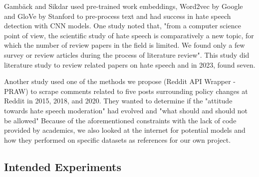 \documentclass[conference]{IEEEtran}
\begin{document}
Gambäck and Sikdar\cite{b16} used pre-trained work embeddings, Word2vec by Google and GloVe by Stanford to pre-process text and had success in hate speech detection with CNN models. One study noted that, "from a computer science point of view, the scientific study of hate speech is comparatively a new topic, for which the number of review papers in the field is limited. We found only a few survey or review articles during the process of literature review"\cite{b10}. This study did literature study to review related papers on hate speech and in 2023, found seven\cite{b10}. 

Another study used one of the methods we propose (Reddit API Wrapper - PRAW) to scrape comments related to five posts surrounding policy changes at Reddit in 2015, 2018, and 2020. They wanted to determine if the "attitude towards hate speech moderation" had evolved and "what should and should not be allowed"\cite{b22} Because of the aforementioned constraints with the lack of code provided by academics, we also looked at the internet for potential models and how they performed on specific datasets as references for our own project.  

\subsection{Intended Experiments}
\end{document}
